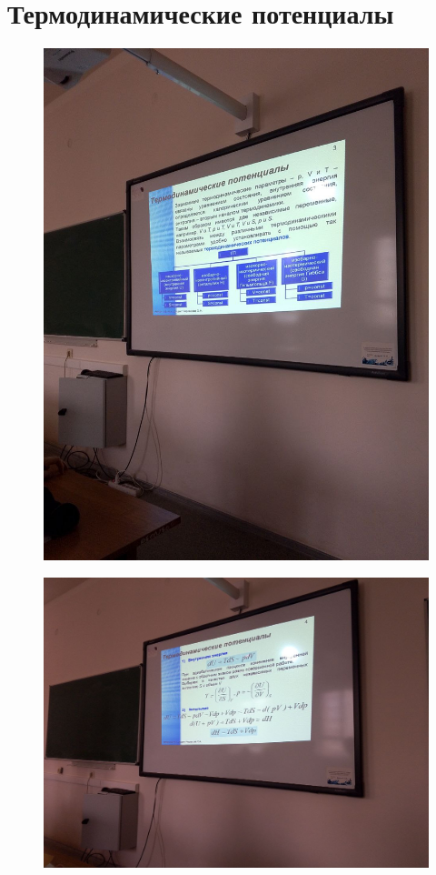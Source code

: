 \documentclass{article}
\begin{document}
\section{Термодинамические потенциалы}
\begin{figure}[H]
    \includegraphics[width=\textwidth]{2.jpg}
\end{figure}
\begin{figure}[H]
    \includegraphics[width=\textwidth]{3.jpg}
\end{figure}
\end{document}
